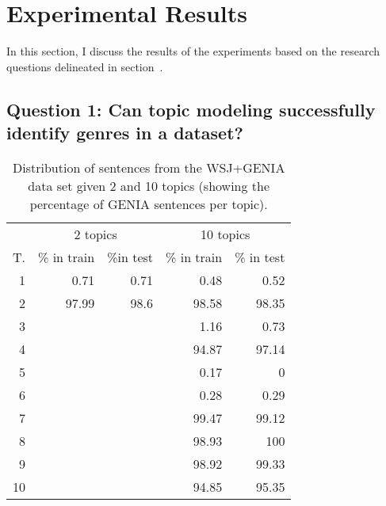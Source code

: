 


\section{Experimental Results}\label{sec:results}


In this section, I discuss the results of the experiments based on the research questions delineated in section~\label{sec:quest}.

\subsection*{Question 1: Can topic modeling successfully identify genres in a dataset?}


\begin{table}[t!]
	\begin{center}
		\begin{tabular}{r|rr|rr} 
			& \multicolumn{2}{c|}{2 topics} & \multicolumn{2}{c}{10 topics}\\
			T. &\% in train & \%in test & \% in train & \% in test \\ 
			\hline
			1 	& 0.71	& 	0.71 	& 0.48 	& 0.52		\\ 
			2 	& 97.99	& 	98.6	& 98.58 	& 98.35				\\
			3 	& 		& 			& 1.16 	& 0.73			\\ 
			4 	& 		& 			& 94.87	& 97.14		\\
			5 	& 		& 			& 0.17	& 0			\\  
			6 	& 		& 			& 0.28 	& 0.29				\\  
			7 	& 		& 			& 99.47	& 99.12			\\  
			8 	& 		& 			& 98.93 	& 100		\\ 
			9 	& 		& 			& 98.92	& 99.33			\\ 
			10 	& 		&			& 94.85 	& 95.35			\\   
			\hline 
		\end{tabular}
	\end{center}
	\caption{Distribution of sentences from the WSJ+GENIA data set given 2 and 10 topics (showing the percentage of GENIA sentences per topic).\label{tab:cluster}}
\end{table}

